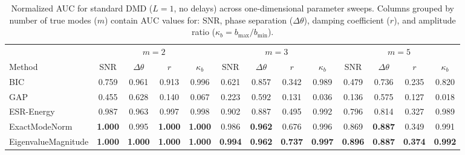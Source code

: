 \begin{table}[t]
\centering
\small
\setlength{\tabcolsep}{3pt}
\begin{tabular}{lcccccccccccc}
\hline
 & \multicolumn{4}{c}{$m = 2$} & \multicolumn{4}{c}{$m = 3$} & \multicolumn{4}{c}{$m = 5$} \\
Method & SNR & $\Delta\theta$ & $r$ & $\kappa_b$ & SNR & $\Delta\theta$ & $r$ & $\kappa_b$ & SNR & $\Delta\theta$ & $r$ & $\kappa_b$ \\
\hline
BIC & 0.759 & 0.961 & 0.913 & 0.996 & 0.621 & 0.857 & 0.342 & 0.989 & 0.479 & 0.736 & 0.235 & 0.820 \\
GAP & 0.455 & 0.628 & 0.140 & 0.067 & 0.223 & 0.592 & 0.131 & 0.036 & 0.136 & 0.575 & 0.127 & 0.018 \\
ESR-Energy & 0.987 & 0.963 & 0.997 & 0.998 & 0.902 & 0.887 & 0.495 & 0.992 & 0.796 & 0.814 & 0.327 & 0.989 \\
ExactModeNorm & \textbf{1.000} & 0.995 & \textbf{1.000} & \textbf{1.000} & 0.986 & \textbf{0.962} & 0.676 & 0.996 & 0.869 & \textbf{0.887} & 0.349 & 0.991 \\
EigenvalueMagnitude & \textbf{1.000} & \textbf{1.000} & \textbf{1.000} & \textbf{1.000} & \textbf{0.994} & \textbf{0.962} & \textbf{0.737} & \textbf{0.997} & \textbf{0.896} & \textbf{0.887} & \textbf{0.374} & \textbf{0.992} \\
\hline
\end{tabular}
\caption{Normalized AUC for standard DMD ($L=1$, no delays) across one-dimensional parameter sweeps. Columns grouped by number of true modes ($m$) contain AUC values for: SNR, phase separation ($\Delta\theta$), damping coefficient ($r$), and amplitude ratio ($\kappa_b = b_{\max}/b_{\min}$).}
\label{tab:auc_L1}
\end{table}
